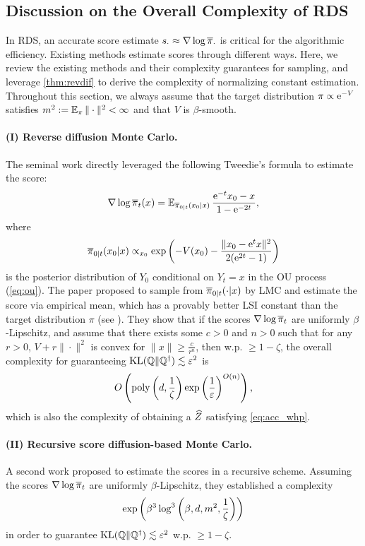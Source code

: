 \subsection{Discussion on the Overall Complexity of RDS}
\label{app:revdif_overall}
In RDS, an accurate score estimate $s_\cdot\approx\nabla\log\overline{\pi}_\cdot$ is critical for the algorithmic efficiency. Existing methods estimate scores through different ways. Here, we review the existing methods and their complexity guarantees for sampling, and leverage \cref{thm:revdif} to derive the complexity of normalizing constant estimation. Throughout this section, we always assume that the target distribution $\pi\propto\mathrm{e}^{-V}$ satisfies $m^2:=\operatorname{\mathbb{E}}_\pi\|\cdot\|^2<\infty$ and that $V$ is $\beta$-smooth.

\paragraph{(I) Reverse diffusion Monte Carlo.} The seminal work directly leveraged the following Tweedie's formula \citep{robbins1992an} to estimate the score:
\cite{huang2024reverse} 
\begin{equation}
    \nabla\log\overline{\pi}_t(x)=\operatorname{\mathbb{E}}_{\overline{\pi}_{0|t}(x_0|x)}\frac{\mathrm{e}^{-t}x_0-x}{1-\mathrm{e}^{-2t}},    
    \label{eq:rds_score}
\end{equation}
where
\begin{equation}
    \overline{\pi}_{0|t}(x_0|x)\propto_{x_0}\exp\left(-V(x_0)-\frac{\|x_0-\mathrm{e}^tx\|^2}{2(\mathrm{e}^{2t}-1)}\right)
    \label{eq:rds_post}
\end{equation}
is the posterior distribution of $Y_0$ conditional on $Y_t=x$ in the OU process (\cref{eq:ou}). The paper proposed to sample from $\overline{\pi}_{0|t}(\cdot|x)$ by LMC and estimate the score via empirical mean, which has a provably better LSI constant than the target distribution $\pi$ (see \citet[Lem. 2]{huang2024reverse}). They show that if the scores $\nabla\log\overline{\pi}_t$ are uniformly $\beta$-Lipschitz, and assume that there exists some $c>0$ and $n>0$ such that for any $r>0$, $V+r\|\cdot\|^2$ is convex for $\|x\|\ge\frac{c}{r^n}$, then w.p. $\ge1-\zeta$, the overall complexity for guaranteeing $\operatorname{KL}(\mathbb{Q}\|\mathbb{Q}^\dagger)\lesssim\varepsilon^2$ is $$O\left(\operatorname{poly}\left(d,\frac1\zeta\right)\exp\left(\frac{1}{\varepsilon}\right)^{O(n)}\right),$$
which is also the complexity of obtaining a $\widehat{Z}$ satisfying \cref{eq:acc_whp}.

\paragraph{(II) Recursive score diffusion-based Monte Carlo.} A second work \cite{huang2024faster} proposed to estimate the scores in a recursive scheme. Assuming the scores $\nabla\log\overline{\pi}_t$ are uniformly $\beta$-Lipschitz, they established a complexity
$$\exp\left(\beta^3\log^3\left(\beta,d,m^2,\frac{1}{\zeta}\right)\right)$$
in order to guarantee $\operatorname{KL}(\mathbb{Q}\|\mathbb{Q}^\dagger)\lesssim\varepsilon^2$ w.p. $\ge1-\zeta$.

